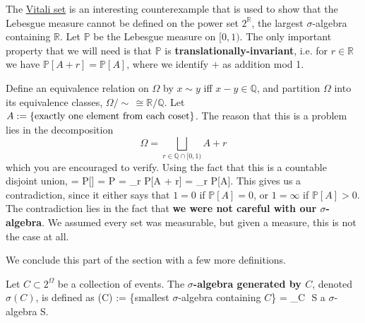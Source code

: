 \begin{example}
	The \href{https://en.wikipedia.org/wiki/Vitali_set}{Vitali set} is an interesting counterexample that is used to show that the Lebesgue measure cannot be defined on the power set $2^\mathbb R$, the largest $\sigma$-algebra containing $\mathbb R$. Let $\mathbb P$ be the Lebesgue measure on $[0, 1)$. The only important property that we will need is that $\mathbb P$ is \textbf{translationally-invariant}, i.e. for $r\in\mathbb R$ we have $\mathbb P[A + r] = \mathbb P[A]$, where we identify $+$ as addition mod 1. 
	
	Define an equivalence relation on $\Omega$ by $x\sim y$ iff $x - y\in\mathbb Q$, and partition $\Omega$ into its equivalence classes, $\Omega / \sim\,\cong \mathbb R / \mathbb Q$. Let $A := \{\textnormal{exactly one element from each coset} \}$. The reason that this is a problem lies in the decomposition
	\begin{equation}
		\Omega = \bigsqcup_{r\in\mathbb Q\cap [0, 1)} A + r
	\end{equation}
	which you are encouraged to verify. Using the fact that this is a countable disjoint union,
	 = \mathbb P[\Omega] = \mathbb P \left[ \bigsqcup_{r\in\mathbb Q\cap [0, 1)} A + r \right] = \sum_r \mathbb P[A + r] = \sum_r \mathbb P[A].
	\qe
	This gives us a contradiction, since it either says that $1 = 0$ if $\mathbb P[A] = 0$, or $1 = \infty$ if $\mathbb P[A] > 0$. The contradiction lies in the fact that \textbf{we were not careful with our $\sigma$-algebra}. We assumed every set was measurable, but given a measure, this is not the case at all. 
\end{example}

We conclude this part of the section with a few more definitions.
\begin{definition}
	Let $C\subset 2^\Omega$ be a collection of events. The \textbf{$\sigma$-algebra generated by $C$}, denoted $\sigma(C)$, is defined as
	\eq
		\sigma(C) := \{\textnormal{smallest $\sigma$-algebra containing $C$}\} = \bigcap_{C\,\subseteq\, S\textnormal{ a $\sigma$-algebra}} S.
	\qe
\end{definition}

